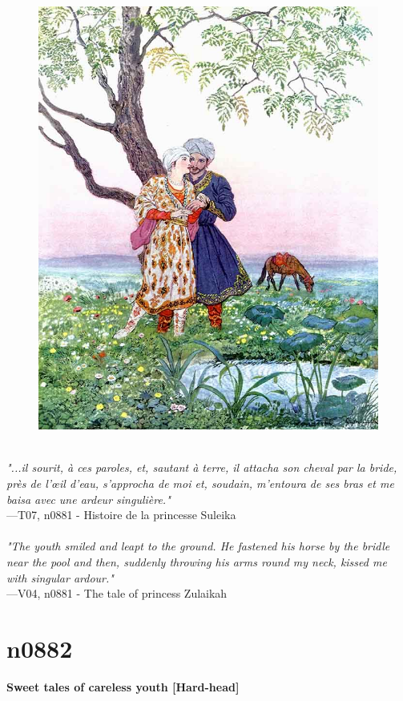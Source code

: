 \documentclass[../Carre_nights.tex]{subfiles}
\begin{document}
\begin{figure}[ht]
\centering
\includegraphics[height=\figsize]{illustrations/volume_7/T07, n0881 - Histoire de la princesse Suleika.jpg}
\end{figure}

\textit{\\
"...il sourit, à ces paroles, et, sautant à terre, il attacha son cheval par la bride, près de l’œil d’eau, s’approcha de moi et, soudain, m’entoura de ses bras et me baisa avec une ardeur singulière."} \\
—T07, n0881 - Histoire de la princesse Suleika \\~\\
\textit{"The youth smiled and leapt to the ground. He fastened his horse by the bridle near the pool and then, suddenly throwing his arms round my neck, kissed me with singular ardour."} \\
—V04, n0881 - The tale of princess Zulaikah

\newpage

\section{n0882}
\textbf{\Large{Sweet tales of careless youth [Hard-head]}} \\
\end{document}
